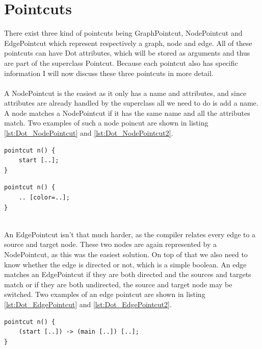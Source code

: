 \documentclass[a4paper]{report}
\begin{document}
\section{Pointcuts}
There exist three kind of pointcuts being GraphPointcut, NodePointcut and EdgePointcut which represent respectively a graph, node and edge. All of these pointcuts can have Dot attributes, which will be stored as arguments and thus are part of the superclass Pointcut. Because each pointcut also has specific information I will now discuss these three pointcuts in more detail.\\
\\
A NodePointcut is the easiest as it only has a name and attributes, and since attributes are already handled by the superclass all we need to do is add a name. A node matches a NodePointcut if it has the same name and all the attributes match. Two examples of such a node poincut are shown in listing \ref{lst:Dot_NodePointcut} and \ref{lst:Dot_NodePointcut2}.\\
\begin{minipage}{0.45\textwidth}
\begin{lstlisting}[caption=A node pointcut matching any node start., label=lst:Dot_NodePointcut]
pointcut n() {
	start [..];
}
\end{lstlisting}
\end{minipage}\hfill
\begin{minipage}{0.45\textwidth}
\begin{lstlisting}[caption=A node pointcut matching any node with only a color., label=lst:Dot_NodePointcut2]
pointcut n() {
	.. [color=..];
}
\end{lstlisting}
\end{minipage}
\\
An EdgePointcut isn't that much harder, as the compiler relates every edge to a source and target node. These two nodes are again represented by a NodePointcut, as this was the easiest solution. On top of that we also need to know whether the edge is directed or not, which is a simple boolean. An edge matches an EdgePointcut if they are both directed and the sources and targets match or if they are both undirected, the source and target node may be switched. Two examples of an edge pointcut are shown in listing \ref{lst:Dot_EdgePointcut} and \ref{lst:Dot_EdgePointcut2}.\\
\begin{minipage}{0.45\textwidth}
\begin{lstlisting}[caption=An edge pointcut matching any edge from start to main., label=lst:Dot_EdgePointcut]
pointcut n() {
	(start [..]) -> (main [..]) [..];
}
\end{lstlisting}
\end{minipage}\hfill
\end{document}
